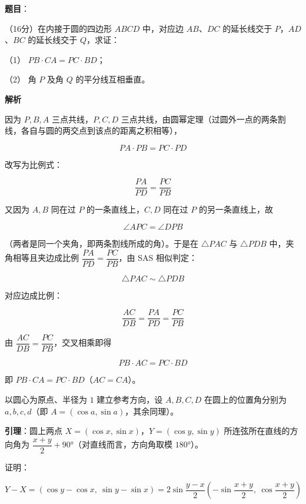 \begin{answer}

\textbf{题目}：

（16分）在内接于圆的四边形 $ABCD$ 中，对应边 $AB$、$DC$ 的延长线交于 $P$，$AD$、$BC$ 的延长线交于 $Q$，求证：

（1） $PB\cdot CA=PC\cdot BD$；

（2） 角 $P$ 及角 $Q$ 的平分线互相垂直。

\textbf{解析}


因为 $P,B,A$ 三点共线，$P,C,D$ 三点共线，由圆幂定理（过圆外一点的两条割线，各自与圆的两交点到该点的距离之积相等），

\nopagebreak[4]
\[
PA\cdot PB=PC\cdot PD
\]

改写为比例式：

\nopagebreak[4]
\[
\frac{PA}{PD}=\frac{PC}{PB}
\]

又因为 $A,B$ 同在过 $P$ 的一条直线上，$C,D$ 同在过 $P$ 的另一条直线上，故

\nopagebreak[4]
\[
\angle APC=\angle DPB
\]

（两者是同一个夹角，即两条割线所成的角）。于是在 $\triangle PAC$ 与 $\triangle PDB$ 中，夹角相等且夹边成比例 $\dfrac{PA}{PD}=\dfrac{PC}{PB}$，由 SAS 相似判定：

\nopagebreak[4]
\[
\triangle PAC\sim\triangle PDB
\]

对应边成比例：

\nopagebreak[4]
\[
\frac{AC}{DB}=\frac{PA}{PD}=\frac{PC}{PB}
\]

由 $\dfrac{AC}{DB}=\dfrac{PC}{PB}$，交叉相乘即得

\nopagebreak[4]
\[
PB\cdot AC=PC\cdot BD
\]

即 $PB\cdot CA=PC\cdot BD$（$AC=CA$）。


以圆心为原点、半径为 $1$ 建立参考方向，设 $A,B,C,D$ 在圆上的位置角分别为 $a,b,c,d$（即 $A=(\cos a,\sin a)$，其余同理）。

\textbf{引理}：圆上两点 $X=(\cos x,\sin x)$，$Y=(\cos y,\sin y)$ 所连弦所在直线的方向角为 $\dfrac{x+y}2+90°$（对直线而言，方向角取模 $180°$）。

证明：

\nopagebreak[4]
\[
Y-X=\left(\cos y-\cos x,\ \sin y-\sin x\right)=2\sin\frac{y-x}2\left(-\sin\frac{x+y}2,\ \cos\frac{x+y}2\right)
\]


\end{answer}
